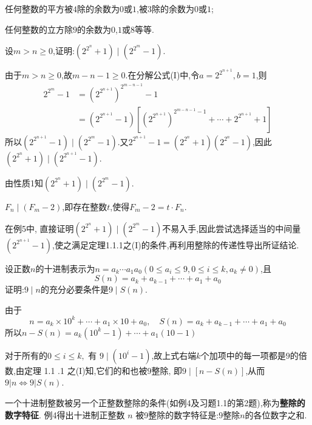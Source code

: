 任何整数的平方被$4$除的余数为$0$或$1$,被$3$除的余数为$0$或$1$;

任何整数的立方除$9$的余数为$0$,$1$或$8$等等.

\example 设$m>n\geqslant0$,证明:$(2^{2^{n}}+1)\mid(2^{2^{m}}-1)$.

\proof 由于$m>n \geqslant 0$,故$m-n-1 \geqslant 0$.在分解公式(I)中,令$a=2^{2^{n+1}},b=1$,则
\begin{equation*}
	\begin{split}
		2^{2^{m}}-1&=\left(2^{2^{n+1}}\right)^{2^{m-n-1}}-1\\
		&=\left(2^{2^{n+1}}-1\right)\left[\left(2^{2^{n+1}}\right)^{2^{m-n-1}-1}+\cdots+2^{2^{n+1}}+1\right]
	\end{split}
\end{equation*}
所以$\left(2^{2^{n+1}}-1\right) \mid\left(2^{2^{m}}-1\right)$.又$2^{2^{n+1}}-1=\left(2^{2^{n}}+1\right)\left(2^{2^{n}}-1\right)$,因此$\left(2^{2^{n}}+1\right) \mid\left(2^{2^{n+1}}-1\right)$.

由性质1知$\left(2^{2^{n}}+1\right) \mid\left(2^{2^{m}}-1\right)$.

\remark $F_{n} \mid\left(F_{m}-2\right)$,即存在整数$t$,使得$F_{m}-2=t \cdot F_{n}$.

\remark 在例5中, 直接证明$\left(2^{2^{n}}+1\right) \mid\left(2^{2^{m}}-1\right)$不易入手,因此尝试选择适当的中间量$\left(2^{2^{n+1}}-1\right)$,使之满足定理1.1.1之(I)的条件,再利用整除的传递性导出所证结论.

\example 设正数$n$的十进制表示为$n=a_{k}\cdots a_{1}a_{0}(0\leqslant a_{i}\leqslant 9,0\leqslant i\leqslant k,a_{k}\neq 0)$,且
\begin{equation*}
	S(n)=a_{k}+a_{k-1}+\cdots+a_{1}+a_{0}
\end{equation*}
证明:$9\mid n$的充分必要条件是$9\mid S(n)$.

\proof 由于
\begin{equation*}
	n=a_{k} \times 10^{k}+\cdots+a_{1} \times 10+a_{0}, \quad S(n)=a_{k}+a_{k-1}+\cdots+a_{1}+a_{0}
\end{equation*}
所以$n-S(n)=a_{k}\left(10^{k}-1\right)+\cdots+a_{1}(10-1)$

对于所有的$0 \leqslant i \leqslant k,$ 有 $9 \mid\left(10^{i}-1\right)$,故上式右端$k$个加项中的每一项都是$9$的倍数,由定理 1.1 .1 之(I)知,它们的和也被$9$整除, 即$9 \mid[n-S(n)]$,从而 $9|n \Leftrightarrow 9| S(n)$.

\remark 一个十进制整数被另一个正整数整除的条件(如例4及习题1.1的第2题),称为\textbf{整除的数字特征}. 例4得出十进制正整数 $n$ 被9整除的数字特征是:$9$整除$n$的各位数字之和.

